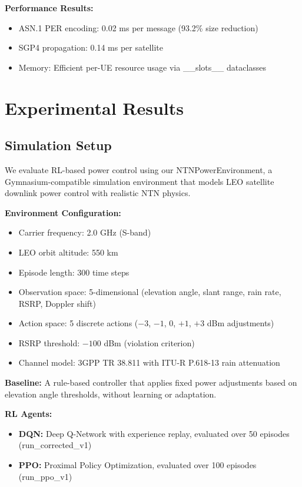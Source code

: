 \documentclass[conference]{IEEEtran}
\begin{document}
\textbf{Performance Results:}
\begin{itemize}
    \item ASN.1 PER encoding: 0.02 ms per message (93.2\% size reduction)
    \item SGP4 propagation: 0.14 ms per satellite
    \item Memory: Efficient per-UE resource usage via \_\_slots\_\_ dataclasses
\end{itemize}

\section{Experimental Results}

\subsection{Simulation Setup}

We evaluate RL-based power control using our NTNPowerEnvironment, a Gymnasium-compatible simulation environment that models LEO satellite downlink power control with realistic NTN physics.

\textbf{Environment Configuration:}
\begin{itemize}
    \item Carrier frequency: 2.0 GHz (S-band)
    \item LEO orbit altitude: 550 km
    \item Episode length: 300 time steps
    \item Observation space: 5-dimensional (elevation angle, slant range, rain rate, RSRP, Doppler shift)
    \item Action space: 5 discrete actions ($-3$, $-1$, $0$, $+1$, $+3$ dBm adjustments)
    \item RSRP threshold: $-100$ dBm (violation criterion)
    \item Channel model: 3GPP TR 38.811 with ITU-R P.618-13 rain attenuation
\end{itemize}

\textbf{Baseline:} A rule-based controller that applies fixed power adjustments based on elevation angle thresholds, without learning or adaptation.

\textbf{RL Agents:}
\begin{itemize}
    \item \textbf{DQN:} Deep Q-Network with experience replay, evaluated over 50 episodes (run\_corrected\_v1)
    \item \textbf{PPO:} Proximal Policy Optimization, evaluated over 100 episodes (run\_ppo\_v1)
\end{itemize}
\end{document}
